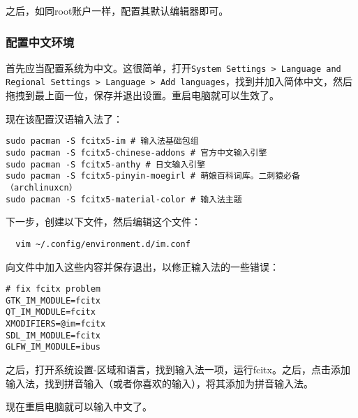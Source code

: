 \documentclass[../main.tex]{subfiles}
\begin{document}
之后，如同root账户一样，配置其默认编辑器即可。

\subsubsection{配置中文环境}

首先应当配置系统为中文。这很简单，打开\texttt{System Settings > Language and Regional Settings > Language > Add languages}，找到并加入简体中文，然后拖拽到最上面一位，保存并退出设置。重启电脑就可以生效了。

现在该配置汉语输入法了：
\begin{lstlisting}
sudo pacman -S fcitx5-im # 输入法基础包组
sudo pacman -S fcitx5-chinese-addons # 官方中文输入引擎
sudo pacman -S fcitx5-anthy # 日文输入引擎
sudo pacman -S fcitx5-pinyin-moegirl # 萌娘百科词库。二刺猿必备（archlinuxcn）
sudo pacman -S fcitx5-material-color # 输入法主题
\end{lstlisting}
下一步，创建以下文件，然后编辑这个文件：
\begin{lstlisting}
  vim ~/.config/environment.d/im.conf
\end{lstlisting}
向文件中加入这些内容并保存退出，以修正输入法的一些错误：
\begin{lstlisting}
# fix fcitx problem
GTK_IM_MODULE=fcitx
QT_IM_MODULE=fcitx
XMODIFIERS=@im=fcitx
SDL_IM_MODULE=fcitx
GLFW_IM_MODULE=ibus
\end{lstlisting}
之后，打开系统设置-区域和语言，找到输入法一项，运行fcitx。之后，点击添加输入法，找到拼音输入（或者你喜欢的输入），将其添加为拼音输入法。

现在重启电脑就可以输入中文了。
\end{document}
